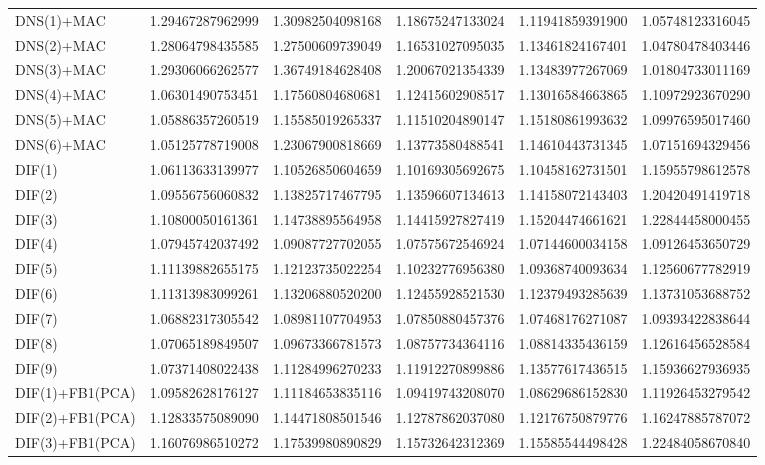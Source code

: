 \begin{table}[htb]
\begin{adjustbox}{totalheight=\baselineskip}
\begin{tabular}{lSSSSS}
DNS(1)+MAC & 1.29467287962999 & 1.30982504098168 & 1.18675247133024 & 1.11941859391900 & 1.05748123316045 \\ 
DNS(2)+MAC & 1.28064798435585 & 1.27500609739049 & 1.16531027095035 & 1.13461824167401 & 1.04780478403446 \\ 
DNS(3)+MAC & 1.29306066262577 & 1.36749184628408 & 1.20067021354339 & 1.13483977267069 & 1.01804733011169 \\ 
DNS(4)+MAC & 1.06301490753451 & 1.17560804680681 & 1.12415602908517 & 1.13016584663865 & 1.10972923670290 \\ 
DNS(5)+MAC & 1.05886357260519 & 1.15585019265337 & 1.11510204890147 & 1.15180861993632 & 1.09976595017460 \\ 
DNS(6)+MAC & 1.05125778719008 & 1.23067900818669 & 1.13773580488541 & 1.14610443731345 & 1.07151694329456 \\ 
DIF(1) & 1.06113633139977 & 1.10526850604659 & 1.10169305692675 & 1.10458162731501 & 1.15955798612578 \\ 
DIF(2) & 1.09556756060832 & 1.13825717467795 & 1.13596607134613 & 1.14158072143403 & 1.20420491419718 \\ 
DIF(3) & 1.10800050161361 & 1.14738895564958 & 1.14415927827419 & 1.15204474661621 & 1.22844458000455 \\ 
DIF(4) & 1.07945742037492 & 1.09087727702055 & 1.07575672546924 & 1.07144600034158 & 1.09126453650729 \\ 
DIF(5) & 1.11139882655175 & 1.12123735022254 & 1.10232776956380 & 1.09368740093634 & 1.12560677782919 \\ 
DIF(6) & 1.11313983099261 & 1.13206880520200 & 1.12455928521530 & 1.12379493285639 & 1.13731053688752 \\ 
DIF(7) & 1.06882317305542 & 1.08981107704953 & 1.07850880457376 & 1.07468176271087 & 1.09393422838644 \\ 
DIF(8) & 1.07065189849507 & 1.09673366781573 & 1.08757734364116 & 1.08814335436159 & 1.12616456528584 \\ 
DIF(9) & 1.07371408022438 & 1.11284996270233 & 1.11912270899886 & 1.13577617436515 & 1.15936627936935 \\ 
DIF(1)+FB1(PCA) & 1.09582628176127 & 1.11184653835116 & 1.09419743208070 & 1.08629686152830 & 1.11926453279542 \\ 
DIF(2)+FB1(PCA) & 1.12833575089090 & 1.14471808501546 & 1.12787862037080 & 1.12176750879776 & 1.16247885787072 \\ 
DIF(3)+FB1(PCA) & 1.16076986510272 & 1.17539980890829 & 1.15732642312369 & 1.15585544498428 & 1.22484058670840 \\ 

\end{tabular}
\end{adjustbox}
\end{table}
